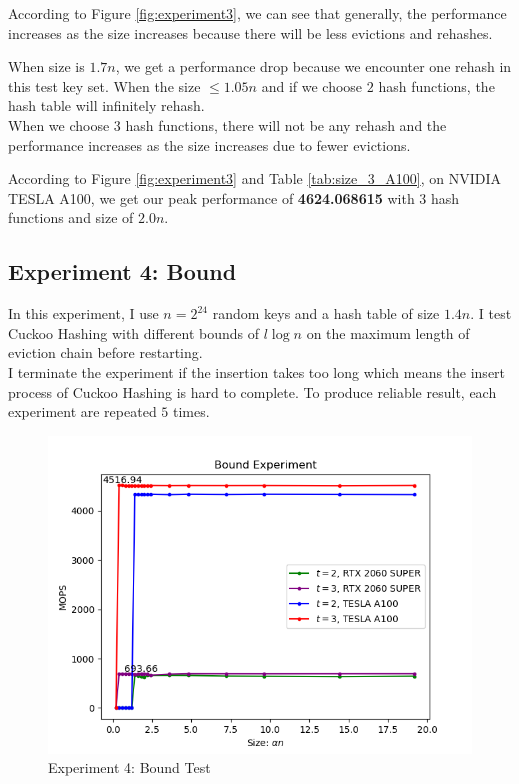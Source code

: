 \documentclass[10pt,twocolumn,letterpaper]{article}
\begin{document}
According to Figure \ref{fig:experiment3}, we can see that generally, the performance increases as the size increases because there will be less evictions and rehashes. 

When size is $1.7n$, we get a performance drop because we encounter one rehash in this test key set. When the size $\leq 1.05n$ and if we choose $2$ hash functions, the hash table will infinitely rehash.\\

When we choose $3$ hash functions, there will not be any rehash and the performance increases as the size increases due to fewer evictions.

According to Figure \ref{fig:experiment3} and Table \ref{tab:size_3_A100}, on NVIDIA TESLA A100, we get our peak performance of \textbf{4624.068615} with $3$ hash functions and size of $2.0n$.

\subsection{Experiment 4: Bound}

In this experiment, I use $n = 2^{24}$ random keys and a hash table of size $1.4n$. I test Cuckoo Hashing with different bounds of $l \log n$ on the maximum length of eviction chain before restarting.\\ I terminate the experiment if the insertion takes too long which means the insert process of Cuckoo Hashing is hard to complete. To produce reliable result, each experiment are repeated $5$ times.


\begin{figure}[h]
    \centering
    \includegraphics[scale=0.5]{figures/4.png}
    \caption{Experiment 4: Bound Test}
    \label{fig:experiment4}
\end{figure}
\end{document}
